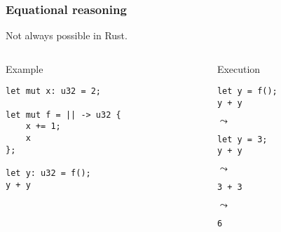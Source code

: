 \documentclass[t]{beamer}
\begin{document}
\begin{frame}[fragile]
\frametitle{Equational reasoning}
Not always possible in Rust.

\begin{columns}

\begin{column}[T]{0.48\textwidth}
\begin{block}{Example}
\begin{verbatim}
let mut x: u32 = 2;

let mut f = || -> u32 {
    x += 1;
    x
};

let y: u32 = f();
y + y
\end{verbatim}
\end{block}
\end{column}

\begin{column}[T]{0.48\textwidth}
\begin{block}{Execution}
\begin{verbatim}
let y = f();
y + y
\end{verbatim}

\(\leadsto\)

\begin{verbatim}
let y = 3;
y + y
\end{verbatim}

\(\leadsto\)

\begin{verbatim}
3 + 3
\end{verbatim}

\(\leadsto\)

\begin{verbatim}
6
\end{verbatim}
\end{block}
\end{column}

\end{columns}

\end{frame}
\end{document}
